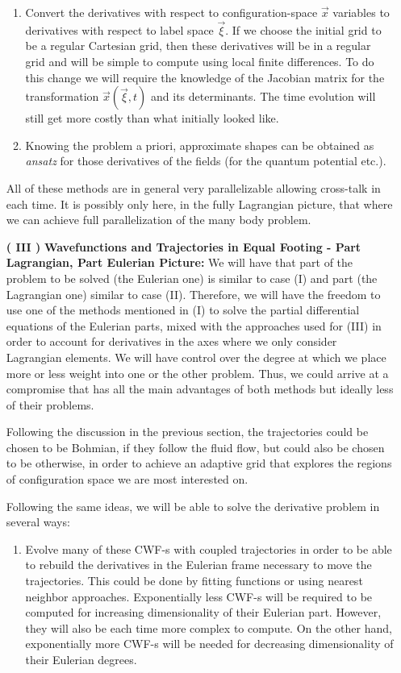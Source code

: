 \documentclass[11pt, a4paper]{article} %
\begin{document}
\begin{enumerate}
\begin{enumerate}
\item Convert the derivatives with respect to configuration-space $\vec{x}$ variables to derivatives with respect to label space $\vec{\xi}$. If we choose the initial grid to be a regular Cartesian grid, then these derivatives will be in a regular grid and will be simple to compute using local finite differences. To do this change we will require the knowledge of the Jacobian matrix for the transformation $\vec{x}(\vec{\xi},t)$ and its determinants. The time evolution will still get more costly than what initially looked like.


\item Knowing the problem a priori, approximate shapes can be obtained as {\em ansatz} for those derivatives of the fields (for the quantum potential etc.).

\end{enumerate}
All of these methods are in general very parallelizable allowing cross-talk in each time. It is possibly only here, in the fully Lagrangian picture, that where we can achieve full parallelization of the many body problem.

\item [\bf ( III )] {\bf Wavefunctions and Trajectories in Equal Footing - Part Lagrangian, Part Eulerian Picture:} We will have that part of the problem to be solved (the Eulerian one) is similar to case (I) and part (the Lagrangian one) similar to case (II). Therefore, we will have the freedom to use one of the methods mentioned in (I) to solve the partial differential equations of the Eulerian parts, mixed with the approaches used for (III) in order to account for derivatives in the axes where we only consider Lagrangian elements. We will have control over the degree at which we place more or less weight into one or the other problem. Thus, we could arrive at a compromise that has all the main advantages of both methods but ideally less of their problems.

Following the discussion in the previous section, the trajectories could be chosen to be Bohmian, if they follow the fluid flow, but could also be chosen to be otherwise, in order to achieve an adaptive grid that explores the regions of configuration space we are most interested on.

Following the same ideas, we will be able to solve the derivative problem in several ways:
\begin{enumerate}
\item Evolve many of these CWF-s with coupled trajectories in order to be able to rebuild the derivatives in the Eulerian frame necessary to move the trajectories. This could be done by fitting functions or using nearest neighbor approaches. Exponentially less CWF-s will be required to be computed for increasing dimensionality of their Eulerian part. However, they will also be each time more complex to compute. On the other hand, exponentially more CWF-s will be needed for decreasing dimensionality of their Eulerian degrees.


\end{enumerate}
\end{enumerate}
\end{document}
